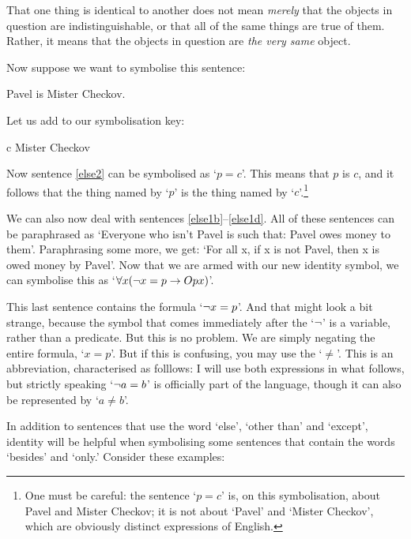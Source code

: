 That one thing is identical to another does not mean \emph{merely} that the objects in question are indistinguishable, or that all of the same things are true of them. Rather, it means that the objects in question are \emph{the very same} object.

Now suppose we want to symbolise this sentence:
\begin{earg}
\item[\ex{else2}] Pavel is Mister Checkov.
\end{earg}
Let us add to our symbolisation key:
	\begin{ekey}
		\item[c] Mister Checkov
	\end{ekey}
Now sentence \ref{else2} can be symbolised as `$p=c$'. This means that $p$ is $c$, and it follows that the thing named by `$p$' is the thing named by `$c$'.\footnote{One must be careful: the sentence `$p=c$' is, on this symbolisation, about Pavel and Mister Checkov; it is not about `Pavel' and `Mister Checkov', which are obviously distinct expressions of English.}

We can also now deal with sentences \ref{else1b}–\ref{else1d}. All of these sentences can be  paraphrased as `Everyone who isn't Pavel is such that: Pavel owes money to them'. Paraphrasing some more, we get: `For all x, if x is not Pavel, then x is owed money by Pavel'. Now that we are armed with our new identity symbol, we can symbolise this as `$\forall x (\neg x = p \rightarrow Opx)$'.

This last sentence contains the formula `$\neg x = p$'. And that might look a bit strange, because the symbol that comes immediately after the `$\neg$' is a variable, rather than a predicate. But this is no problem. We are simply negating the entire formula, `$x = p$'. But if this is confusing, you may use  the  `$≠$'. This is an abbreviation, characterised as folllows:  I will use both expressions in what follows, but strictly speaking `$\neg a = b$' is officially part of the language, though it can also be represented by `$a≠b$'.

In addition to sentences that use the word `else', `other than' and `except', identity will be helpful when symbolising some sentences that contain the words `besides' and `only.' Consider these examples:


